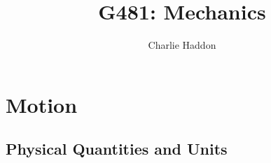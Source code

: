 \documentclass[a4,8pt]{article}
\title{G481: Mechanics}
\author{Charlie Haddon}
\begin{document}
\begin{titlepage}
	\pagenumbering{}
	\maketitle
	\vspace{15cm}
\end{titlepage}
\clearpage


\section{Motion}
\subsection{Physical Quantities and Units}
\end{document}
